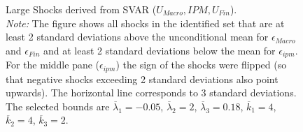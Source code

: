 \documentclass[a4paper,11pt,listof=nochaptergap,oneside,pointednumbers,bibtotoc,bigheadings,liststotoc]{scrbook}
\theoremstyle{mysatz}
\theoremstyle{mydefinition}
\theoremstyle{mybemerkung}
\begin{document}
\begin{figure}[!h]
   \centering
   \setlength\fboxsep{0pt}
   \setlength\fboxrule{0pt}
      \caption[Large Shocks derived from SVAR ($U_{Macro}, IPM, U_{Fin}$).]{Large Shocks derived from SVAR ($U_{Macro}, IPM, U_{Fin}$).\\
      \textit{Note:}  The figure shows all shocks in the identified set that are at least 2 standard deviations above the unconditional mean for $\epsilon_{Macro}$ and $\epsilon_{Fin}$ and at least 2 standard deviations below the mean for $\epsilon_{ipm}$. For the middle pane ($\epsilon_{ipm}$) the sign of the shocks were flipped (so that negative shocks exceeding 2 standard deviations also point upwards). The horizontal line corresponds to 3 standard deviations. The selected bounds are $\overline{\lambda}_1 = -0.05$, $\overline{\lambda}_2 = 2$, $\overline{\lambda}_3 = 0.18$, $\overline{k}_1 = 4$, $\overline{k}_2 = 4$, $\overline{k}_3 = 2$.}   \label{fig:ludvigsonetal_timeseries_e_largeshocks}
\end{figure}
\end{document}
